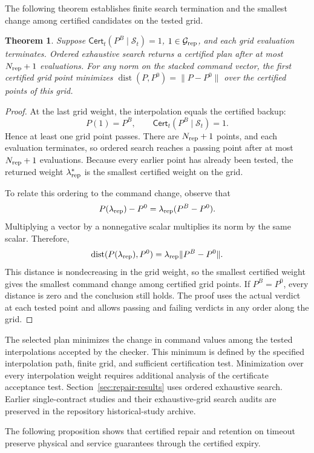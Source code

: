 \documentclass[preprint,12pt]{elsarticle}
\newtheorem{theorem}{Theorem}
\begin{document}
The following theorem establishes finite search termination and the smallest change among certified candidates on the tested grid.

\begin{theorem}
\label{thm:repair-grid}
Suppose $\mathsf{Cert}_t(P^B\mid\mathcal S_t)=1$, $1\in\mathcal G_{\rm rep}$, and each
grid evaluation terminates. Ordered exhaustive search returns a certified
plan after at most $N_{\rm rep}+1$ evaluations. For any norm on the stacked command
vector, the first certified grid point minimizes
$\operatorname{dist}(P,P^0)=\|P-P^0\|$ over the certified points of this grid.
\end{theorem}
\begin{proof}
At the last grid weight, the interpolation equals the certified backup:
\[
 P(1)=P^B,
 \qquad \mathsf{Cert}_t(P^B\mid\mathcal S_t)=1.
\]
Hence at least one grid point passes. There are $N_{\rm rep}+1$ points,
and each evaluation terminates, so ordered search reaches a passing point
after at most $N_{\rm rep}+1$ evaluations. Because every earlier point has
already been tested, the returned weight $\lambda_{\rm rep}^*$ is the
smallest certified weight on the grid.

To relate this ordering to the command change, observe that
\[
 P(\lambda_{\rm rep})-P^0
 =\lambda_{\rm rep}(P^B-P^0).
\]
Multiplying a vector by a nonnegative scalar multiplies its norm by the
same scalar. Therefore,
\[
 \operatorname{dist}(P(\lambda_{\rm rep}),P^0)
 =\lambda_{\rm rep}\|P^B-P^0\|.
\]
This distance is nondecreasing in the grid weight, so the smallest
certified weight gives the smallest command change among certified grid
points. If $P^B=P^0$, every distance is zero and the conclusion still holds.
The proof uses the actual verdict at each tested point and allows passing
and failing verdicts in any order along the grid.
\end{proof}

The selected plan minimizes the change in command values among the tested
interpolations accepted by the checker. This minimum is defined by the
specified interpolation path, finite grid, and sufficient certification
test. Minimization over every interpolation weight requires additional
analysis of the certificate acceptance test. Section~\ref{sec:repair-results} uses ordered
exhaustive search. Earlier single-contract studies and their exhaustive-grid
search audits are preserved in the repository historical-study archive.

The following proposition shows that certified repair and retention on timeout preserve physical and service guarantees through the certified expiry.
\end{document}
